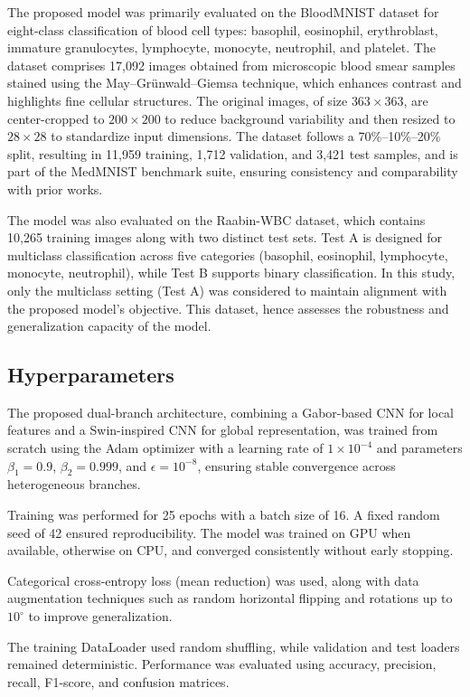 \documentclass[preprint,12pt]{elsarticle}
\begin{document}
The proposed model was primarily evaluated on the BloodMNIST dataset for eight-class classification of blood cell types: basophil, eosinophil, erythroblast, immature granulocytes, lymphocyte, monocyte, neutrophil, and platelet. The dataset comprises 17,092 images obtained from microscopic blood smear samples stained using the May–Grünwald–Giemsa technique, which enhances contrast and highlights fine cellular structures. The original images, of size $363 \times 363$, are center-cropped to $200 \times 200$ to reduce background variability and then resized to $28 \times 28$ to standardize input dimensions. The dataset follows a 70\%–10\%–20\% split, resulting in 11,959 training, 1,712 validation, and 3,421 test samples, and is part of the MedMNIST benchmark suite, ensuring consistency and comparability with prior works.

The model was also evaluated on the Raabin-WBC dataset, which contains 10,265 training images along with two distinct test sets. Test A is designed for multiclass classification across five categories (basophil, eosinophil, lymphocyte, monocyte, neutrophil), while Test B supports binary classification. In this study, only the multiclass setting (Test A) was considered to maintain alignment with the proposed model’s objective. This dataset, hence assesses the robustness and generalization capacity of the model. 

\subsection{Hyperparameters}

The proposed dual-branch architecture, combining a Gabor-based CNN for local features and a Swin-inspired CNN for global representation, was trained from scratch using the Adam optimizer with a learning rate of $1\times10^{-4}$ and parameters $\beta_1=0.9$, $\beta_2=0.999$, and $\epsilon=10^{-8}$, ensuring stable convergence across heterogeneous branches.

Training was performed for 25 epochs with a batch size of 16. A fixed random seed of 42 ensured reproducibility. The model was trained on GPU when available, otherwise on CPU, and converged consistently without early stopping.

Categorical cross-entropy loss (mean reduction) was used, along with data augmentation techniques such as random horizontal flipping and rotations up to $10^\circ$ to improve generalization.

The training DataLoader used random shuffling, while validation and test loaders remained deterministic. Performance was evaluated using accuracy, precision, recall, F1-score, and confusion matrices.
\end{document}
